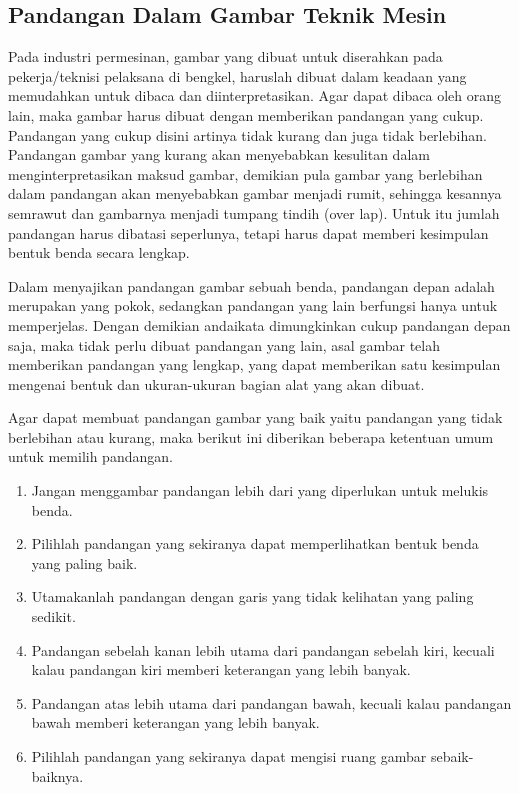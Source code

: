\documentclass[11pt]{simart} %
\begin{document}
\subsection{Pandangan Dalam Gambar Teknik Mesin}
Pada industri permesinan, gambar yang dibuat untuk diserahkan pada pekerja/teknisi pelaksana di bengkel, haruslah dibuat dalam keadaan yang memudahkan untuk dibaca dan diinterpretasikan. Agar dapat dibaca oleh orang lain, maka gambar harus dibuat dengan memberikan pandangan yang cukup. Pandangan yang cukup disini artinya tidak kurang dan juga tidak berlebihan. Pandangan gambar yang kurang akan menyebabkan kesulitan dalam menginterpretasikan maksud gambar, demikian pula gambar yang berlebihan dalam pandangan akan menyebabkan gambar menjadi rumit, sehingga kesannya semrawut dan gambarnya menjadi tumpang tindih (over lap). Untuk itu jumlah pandangan harus dibatasi seperlunya, tetapi harus dapat memberi kesimpulan bentuk benda secara lengkap.

Dalam menyajikan pandangan gambar sebuah benda, pandangan depan adalah merupakan yang pokok, sedangkan pandangan yang lain berfungsi hanya untuk memperjelas. Dengan demikian andaikata dimungkinkan cukup pandangan depan saja, maka tidak perlu dibuat pandangan yang lain, asal gambar telah memberikan pandangan yang lengkap, yang dapat memberikan satu kesimpulan mengenai bentuk dan ukuran-ukuran bagian alat yang akan dibuat.

Agar dapat membuat pandangan gambar yang baik yaitu pandangan yang tidak berlebihan atau kurang, maka berikut ini diberikan beberapa ketentuan umum untuk memilih pandangan.
\begin{enumerate}[label=(\alph*)]
	\item Jangan menggambar pandangan lebih dari yang diperlukan untuk melukis benda.
	\item Pilihlah pandangan yang sekiranya dapat memperlihatkan bentuk benda yang paling baik.
	\item Utamakanlah pandangan dengan garis yang tidak kelihatan yang paling sedikit.
	\item Pandangan sebelah kanan lebih utama dari pandangan sebelah kiri, kecuali kalau pandangan kiri memberi keterangan yang lebih banyak.
	\item Pandangan atas lebih utama dari pandangan bawah, kecuali kalau pandangan bawah memberi keterangan yang lebih banyak.
	\item Pilihlah pandangan yang sekiranya dapat mengisi ruang gambar sebaik-baiknya.
\end{enumerate}
\end{document}
